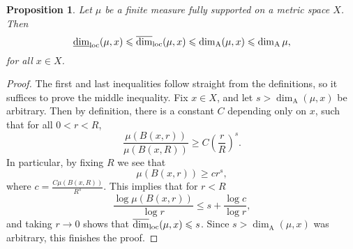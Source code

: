 \documentclass{PRM}
\newcommand{\updim}{\overline{\dim}}
\newcommand{\lowdim}{\underline{\dim}}
\newcommand{\adim}{\dim_{\mathrm{A}}}
\theoremstyle{plain}
\newtheorem{prop}[thm]{Proposition}
\theoremstyle{definition}
\theoremstyle{remark}
\newtheorem{huom}[thm]{Remark}
\begin{document}
\begin{prop}\label{prop:loc_less_assouad}
Let $\mu$ be a finite measure fully supported on a metric space $X$. Then
\begin{equation*}
    \lowdim_{\textnormal{loc}}(\mu,x)\leq\updim_{\textnormal{loc}}(\mu,x)\leq \dim_{\mathrm{A}}(\mu,x)\leq \adim\mu,
\end{equation*}
for all $x\in X$.
\end{prop}
\begin{proof}
The first and last inequalities follow straight from the definitions, so it suffices to prove the middle inequality. Fix $x\in X$, and let $s> \dim_{\mathrm{A}}(\mu,x)$ be arbitrary. Then by definition, there is a constant $C$ depending only on $x$, such that for all $0<r<R$,
\begin{equation*}
    \frac{\mu(B(x,r))}{\mu(B(x,R))}\geq C\left(\frac{r}{R}\right)^s.
\end{equation*}
In particular, by fixing $R$ we see that
\begin{equation*}
    \mu(B(x,r))\geq c r^s,
\end{equation*}
where $c=\frac{C\mu(B(x,R))}{R^s}$. This implies that for $r<R$
\begin{equation*}
    \frac{\log\mu(B(x,r))}{\log r}\leq s + \frac{\log c}{\log r},
\end{equation*}
and taking $r\to 0$ shows that $\updim_{\textnormal{loc}}(\mu,x)\leq s$. Since $s>\dim_{\mathrm{A}}(\mu,x)$ was arbitrary, this finishes the proof.
\end{proof}



\end{document}
